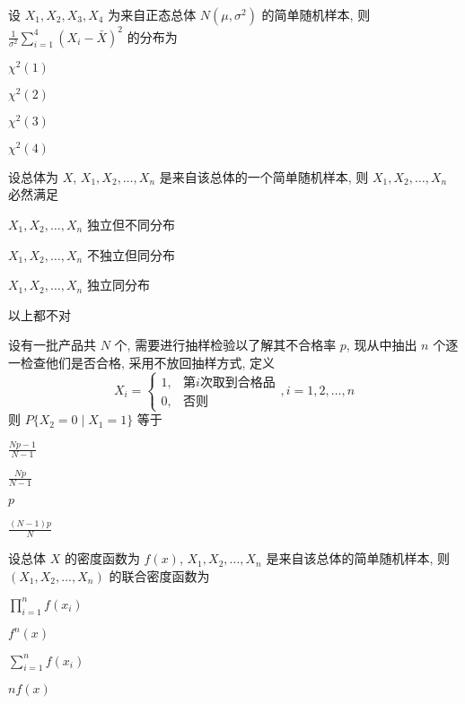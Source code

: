 \documentclass{exam-zh}
\begin{document}
\begin{question}
  设 $X_1, X_2, X_3, X_4$ 为来自正态总体 $N(\mu, \sigma^2)$ 的简单随机样本, 则 $\frac{1}{\sigma^2}\sum_{i=1}^{4}(X_i - \bar{X})^2$ 的分布为
  \paren[C]

  \begin{choices}
    \item $\chi^2(1)$
    \item $\chi^2(2)$
    \item $\chi^2(3)$
    \item $\chi^2(4)$
  \end{choices}
\end{question}

\begin{question}
  设总体为 $X$, $X_1, X_2, \dots, X_n$ 是来自该总体的一个简单随机样本, 则 $X_1, X_2, \dots, X_n$ 必然满足
  \paren[C]

  \begin{choices}
    \item $X_1, X_2, \dots, X_n$ 独立但不同分布
    \item $X_1, X_2, \dots, X_n$ 不独立但同分布
    \item $X_1, X_2, \dots, X_n$ 独立同分布
    \item 以上都不对
  \end{choices}
\end{question}

\begin{question}
  设有一批产品共 $N$ 个, 需要进行抽样检验以了解其不合格率 $p$, 现从中抽出 $n$ 个逐一检查他们是否合格, 采用不放回抽样方式, 定义 $$X_i = \begin{cases} 1, & \text{第} i \text{次取到合格品} \\ 0, & \text{否则} \end{cases}, i=1, 2, \dots, n$$ 则 $P\{X_2 = 0 \mid X_1 = 1\}$ 等于
  \paren[B]

  \begin{choices}
    \item $\frac{Np - 1}{N - 1}$
    \item $\frac{Np}{N - 1}$
    \item $p$
    \item $\frac{(N-1)p}{N}$
  \end{choices}
\end{question}

\begin{question}
  设总体 $X$ 的密度函数为 $f(x)$, $X_1, X_2,\dots, X_n$ 是来自该总体的简单随机样本, 则 $(X_1, X_2, \dots, X_n)$ 的联合密度函数为
  \paren[A]

  \begin{choices}
      \item $\prod_{i=1}^{n} f(x_i)$
      \item $f^n(x)$
      \item $\sum_{i=1}^{n}f(x_i)$
      \item $nf(x)$
  \end{choices}
\end{question}
\end{document}
